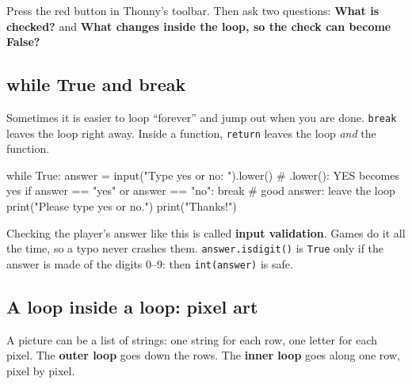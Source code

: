 \begin{tip}
Press the red  button in Thonny's toolbar. Then ask two questions:
\textbf{What is checked?} and \textbf{What changes inside the loop, so the check can become False?}
\end{tip}

\subsection{while True and break}
Sometimes it is easier to loop \enquote{forever} and jump out when you are done. \texttt{break} leaves the loop right away.
Inside a function, \texttt{return} leaves the loop \emph{and} the function.
\begin{pycode}
while True:
    answer = input("Type yes or no: ").lower()   # .lower(): YES becomes yes
    if answer == "yes" or answer == "no":
        break                       # good answer: leave the loop
    print("Please type yes or no.")
print("Thanks!")
\end{pycode}
Checking the player's answer like this is called \textbf{input validation}. Games do it all the time, so a typo never crashes them.
\texttt{answer.isdigit()} is \texttt{True} only if the answer is made of the digits 0--9: then \texttt{int(answer)} is safe.

\subsection{A loop inside a loop: pixel art}
A picture can be a list of strings: one string for each row, one letter for each pixel.
The \textbf{outer loop} goes down the rows. The \textbf{inner loop} goes along one row, pixel by pixel.

